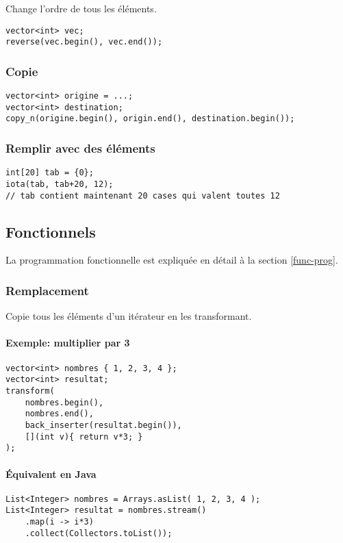 \documentclass[10pt,a4paper,french]{article}
\begin{document}
Change l'ordre de tous les éléments.

\begin{verbatim}
vector<int> vec;
reverse(vec.begin(), vec.end());
\end{verbatim}

\subsubsection{Copie}

\begin{verbatim}
vector<int> origine = ...;
vector<int> destination;
copy_n(origine.begin(), origin.end(), destination.begin());
\end{verbatim}

\subsubsection{Remplir avec des éléments}

\begin{verbatim}
int[20] tab = {0};
iota(tab, tab+20, 12);
// tab contient maintenant 20 cases qui valent toutes 12
\end{verbatim}

\subsection{Fonctionnels}

La programmation fonctionnelle est expliquée en détail à la section \cref{func-prog}.

\subsubsection{Remplacement}

Copie tous les éléments d'un itérateur en les transformant.

\paragraph{Exemple: multiplier par 3}
\begin{verbatim}
vector<int> nombres { 1, 2, 3, 4 };
vector<int> resultat;
transform(
    nombres.begin(),
    nombres.end(),
    back_inserter(resultat.begin()),
    [](int v){ return v*3; }
);
\end{verbatim}

\paragraph{Équivalent en Java}
\begin{verbatim}
List<Integer> nombres = Arrays.asList( 1, 2, 3, 4 );
List<Integer> resultat = nombres.stream()
    .map(i -> i*3)
    .collect(Collectors.toList());
\end{verbatim}
\end{document}

